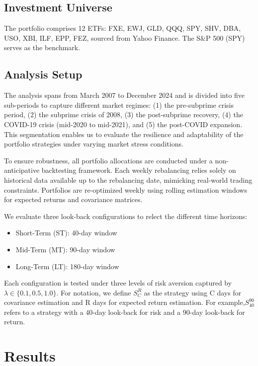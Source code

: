 \documentclass[12pt]{article}
\begin{document}
\subsection{Investment Universe}
The portfolio comprises 12 ETFs: FXE, EWJ, GLD, QQQ, SPY, SHV, DBA, USO, XBI, ILF, EPP, FEZ, sourced from Yahoo Finance. The S\&P 500 (SPY) serves as the benchmark.

\subsection{Analysis Setup}
The analysis spans from March 2007 to December 2024 and is divided into five sub-periods to capture different market regimes: (1) the pre-subprime crisis period, (2) the subprime crisis of 2008, (3) the post-subprime recovery, (4) the COVID-19 crisis (mid-2020 to mid-2021), and (5) the post-COVID expansion. This segmentation enables us to evaluate the resilience and adaptability of the portfolio strategies under varying market stress conditions.

To ensure robustness, all portfolio allocations are conducted under a non-anticipative backtesting framework. Each weekly rebalancing relies solely on historical data available up to the rebalancing date, mimicking real-world trading constraints. Portfolios are re-optimized weekly using rolling estimation windows for expected returns and covariance matrices.

We evaluate three look-back configurations to relect the different time horizons:
\begin{itemize}
	\item Short-Term (ST): 40-day window
	\item Mid-Term (MT): 90-day window
	\item Long-Term (LT): 180-day window
\end{itemize}

Each configuration is tested under three levels of risk aversion captured by  $\lambda \in\lbrace0.1, 0.5, 1.0\rbrace$. For notation, we define $S^{R}_{C}$ as the strategy using C days for covariance estimation and R days for expected return estimation. For example,$ S^{90}_{40}$ refers to a strategy with a 40-day look-back for risk and a 90-day look-back for return.


\section{Results}
\end{document}
